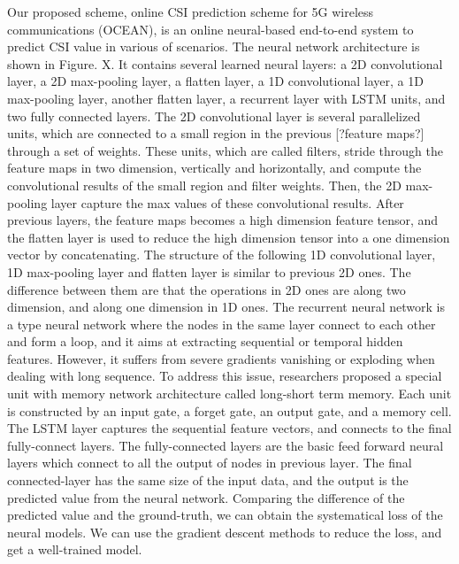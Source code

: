 \documentclass[10pt,conference,letterpaper]{IEEEtran}
\begin{document}
Our proposed scheme, online CSI prediction scheme for 5G wireless communications (OCEAN), is an online neural-based end-to-end system to predict CSI value in various of scenarios. The neural network architecture is shown in Figure. X. It contains several learned neural layers: a 2D convolutional layer, a 2D max-pooling layer, a flatten layer, a 1D convolutional layer, a 1D max-pooling layer, another flatten layer, a recurrent layer with LSTM units, and two fully connected layers. The 2D convolutional layer is several parallelized units, which are connected to a small region in the previous [?feature maps?] through a set of weights. These units, which are called filters, stride through the feature maps in two dimension, vertically and horizontally, and compute the convolutional results of the small region and filter weights. Then, the 2D max-pooling layer capture the max values of these convolutional results. After previous layers, the feature maps becomes a high dimension feature tensor, and the flatten layer is used to reduce the high dimension tensor into a one dimension vector by concatenating. The structure of the following 1D convolutional layer, 1D max-pooling layer and flatten layer is similar to previous 2D ones. The difference between them are that the operations in 2D ones are along two dimension, and along one dimension in 1D ones. The recurrent neural network is a type neural network where the nodes in the same layer connect to each other and form a loop, and it aims at extracting sequential or temporal hidden features. However, it suffers from severe gradients vanishing or exploding when dealing with long sequence. To address this issue, researchers proposed a special unit with memory network architecture called long-short term memory. Each unit is constructed by an input gate, a forget gate, an output gate, and a memory cell. The LSTM layer captures the sequential feature vectors, and connects to the final fully-connect layers. The fully-connected layers are the basic feed forward neural layers which connect to all the output of nodes in previous layer. The final connected-layer has the same size of the input data, and the output is the predicted value from the neural network. Comparing the difference of the predicted value and the ground-truth, we can obtain the systematical loss of the neural models. We can use the gradient descent methods to reduce the loss, and get a well-trained model. 
\end{document}
